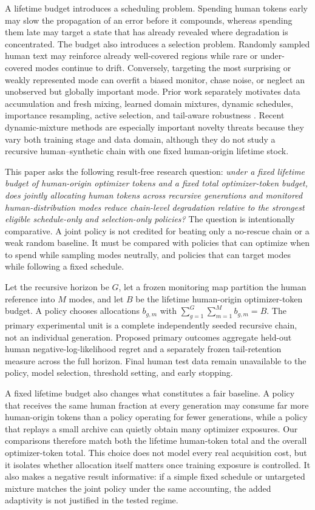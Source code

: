 A lifetime budget introduces a scheduling problem. Spending human tokens early may slow the propagation of an error before it compounds, whereas spending them late may target a state that has already revealed where degradation is concentrated. The budget also introduces a selection problem. Randomly sampled human text may reinforce already well-covered regions while rare or under-covered modes continue to drift. Conversely, targeting the most surprising or weakly represented mode can overfit a biased monitor, chase noise, or neglect an unobserved but globally important mode. Prior work separately motivates data accumulation and fresh mixing, learned domain mixtures, dynamic schedules, importance resampling, active selection, and tail-aware robustness \cite{xie2023doremi,ye2025mixinglaws,liu2025regmix,zhao2026regmixd,wang2026tikmix,xie2023dsir,ash2020badge,liu2021jtt,sohoni2020george}. Recent dynamic-mixture methods are especially important novelty threats because they vary both training stage and data domain, although they do not study a recursive human--synthetic chain with one fixed human-origin lifetime stock.

This paper asks the following result-free research question: \emph{under a fixed lifetime budget of human-origin optimizer tokens and a fixed total optimizer-token budget, does jointly allocating human tokens across recursive generations and monitored human-distribution modes reduce chain-level degradation relative to the strongest eligible schedule-only and selection-only policies?} The question is intentionally comparative. A joint policy is not credited for beating only a no-rescue chain or a weak random baseline. It must be compared with policies that can optimize when to spend while sampling modes neutrally, and policies that can target modes while following a fixed schedule.

Let the recursive horizon be $G$, let a frozen monitoring map partition the human reference into $M$ modes, and let $B$ be the lifetime human-origin optimizer-token budget. A policy chooses allocations $b_{g,m}$ with $\sum_{g=1}^{G}\sum_{m=1}^{M} b_{g,m}=B$. The primary experimental unit is a complete independently seeded recursive chain, not an individual generation. Proposed primary outcomes aggregate held-out human negative-log-likelihood regret and a separately frozen tail-retention measure across the full horizon. Final human test data remain unavailable to the policy, model selection, threshold setting, and early stopping.

A fixed lifetime budget also changes what constitutes a fair baseline. A policy that receives the same human fraction at every generation may consume far more human-origin tokens than a policy operating for fewer generations, while a policy that replays a small archive can quietly obtain many optimizer exposures. Our comparisons therefore match both the lifetime human-token total and the overall optimizer-token total. This choice does not model every real acquisition cost, but it isolates whether allocation itself matters once training exposure is controlled. It also makes a negative result informative: if a simple fixed schedule or untargeted mixture matches the joint policy under the same accounting, the added adaptivity is not justified in the tested regime.

